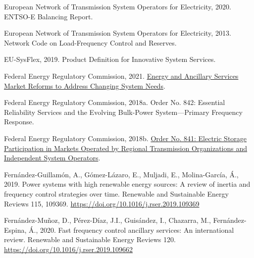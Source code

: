 \documentclass[12pt,a4paper,]{report}
\newlength{\cslhangindent}
\newenvironment{CSLReferences}[2] %
 {%
  \setlength{\parindent}{0pt}
  \ifodd #1 \everypar{\setlength{\hangindent}{\cslhangindent}}\ignorespaces\fi
  \ifnum #2 > 0
  \setlength{\parskip}{#2\baselineskip}
  \fi
 }%
 {}
\begin{document}
\begin{CSLReferences}{1}{0}
\leavevmode{}%
European Network of Transmission System Operators for Electricity, 2020.
{ENTSO-E Balancing Report}.

\leavevmode{}%
European Network of Transmission System Operators for Electricity, 2013.
Network {Code} on {Load-Frequency Control} and {Reserves}.

\leavevmode{}%
EU-SysFlex, 2019. Product {Definition} for {Innovative System Services}.

\leavevmode{}%
Federal Energy Regulatory Commission, 2021.
\href{https://www.ferc.gov/news-events/news/ferc-staff-issues-report-energy-and-ancillary-services-market-reforms-address}{Energy
and {Ancillary Services Market Reforms} to {Address Changing System
Needs}}.

\leavevmode{}%
Federal Energy Regulatory Commission, 2018a. Order {No}. 842: {Essential
Reliability Services} and the {Evolving Bulk-Power System}---{Primary
Frequency Response}.

\leavevmode{}%
Federal Energy Regulatory Commission, 2018b.
\href{https://www.ferc.gov/media/order-no-841}{Order {No}. 841:
{Electric Storage Participation} in {Markets Operated} by {Regional
Transmission Organizations} and {Independent System Operators}}.

\leavevmode{}%
Fernández-Guillamón, A., Gómez-Lázaro, E., Muljadi, E., Molina-García,
Á., 2019. Power systems with high renewable energy sources: {A} review
of inertia and frequency control strategies over time. Renewable and
Sustainable Energy Reviews 115, 109369.
\url{https://doi.org/10.1016/j.rser.2019.109369}

\leavevmode{}%
Fernández-Muñoz, D., Pérez-Díaz, J.I., Guisández, I., Chazarra, M.,
Fernández-Espina, Á., 2020. Fast frequency control ancillary services:
{An} international review. Renewable and Sustainable Energy Reviews 120.
\url{https://doi.org/10.1016/j.rser.2019.109662}


\end{CSLReferences}
\end{document}
